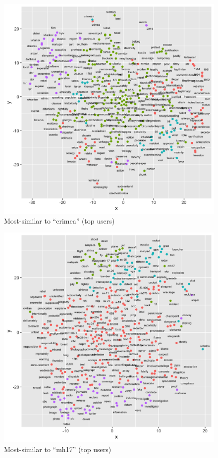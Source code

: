 \begin{figure}[!ht]
\centering
\includegraphics[width=\textwidth]{rus/top_crimea}
\caption{Most-similar to ``crimea'' (top users)}
\label{fig:top_crimea}
\end{figure}

\begin{figure}[!ht]
\centering
\includegraphics[width=\textwidth]{rus/top_mh17}
\caption{Most-similar to ``mh17'' (top users)}
\label{fig:top_mh17}
\end{figure}

